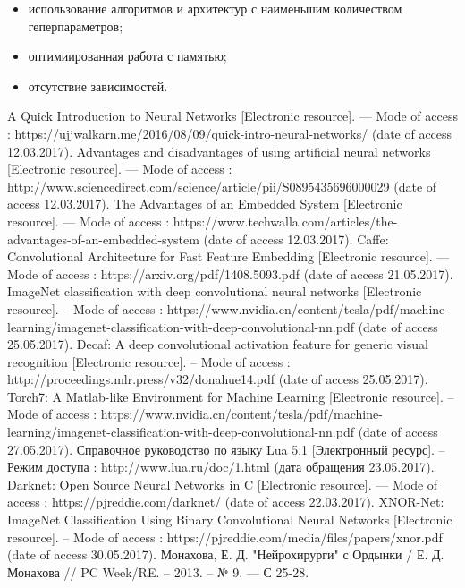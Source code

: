 \documentclass[a4paper,english,russian]{G2-105}
\begin{document}
\begin{itemize}
\item использование алгоритмов и архитектур с наименьшим количеством геперпараметров;
\item оптимиированная работа с памятью;
\item отсутствие зависимостей.
\end{itemize}
\newpage
\begin{thebibliography}{1}
	 A Quick Introduction to Neural Networks [Electronic resource]. --- Mode of access : https://ujjwalkarn.me/2016/08/09/quick-intro-neural-networks/ (date of access 12.03.2017).
	 Advantages and disadvantages of using artificial neural networks [Electronic resource]. --- Mode of access : http://www.sciencedirect.com/science/article/pii/S0895435696000029 (date of access 12.03.2017).
	 The Advantages of an Embedded System [Electronic resource]. --- Mode of access : https://www.techwalla.com/articles/the-advantages-of-an-embedded-system (date of access 12.03.2017).
     Caffe: Convolutional Architecture for Fast Feature Embedding [Electronic resource]. --- Mode of access : https://arxiv.org/pdf/1408.5093.pdf (date of access 21.05.2017).
     ImageNet classification with deep convolutional neural networks [Electronic resource]. – Mode of access : https://www.nvidia.cn/content/tesla/pdf/machine-learning/imagenet-classification-with-deep-convolutional-nn.pdf (date of access 25.05.2017).
     Decaf: A deep convolutional activation feature for generic visual recognition [Electronic resource]. – Mode of access : http://proceedings.mlr.press/v32/donahue14.pdf (date of access 25.05.2017).
     Torch7: A Matlab-like Environment for Machine Learning [Electronic resource]. –  Mode of access : https://www.nvidia.cn/content/tesla/pdf/machine-learning/imagenet-classification-with-deep-convolutional-nn.pdf (date of access 27.05.2017).
     Справочное руководство по языку Lua 5.1 [Электронный ресурс]. – Режим доступа : http://www.lua.ru/doc/1.html (дата обращения 23.05.2017).
     Darknet: Open Source Neural Networks in C [Electronic resource].
— Mode of access : https://pjreddie.com/darknet/ (date of access 22.03.2017).
     XNOR-Net: ImageNet Classification Using Binary Convolutional Neural Networks [Electronic resource]. – Mode of access : https://pjreddie.com/media/files/papers/xnor.pdf (date of access 30.05.2017).
     Монахова, Е. Д. "Нейрохирурги" с Ордынки / Е. Д. Монахова // PC Week/RE. – 2013. – № 9. --- С 25-28.

\end{thebibliography}
\end{document}
